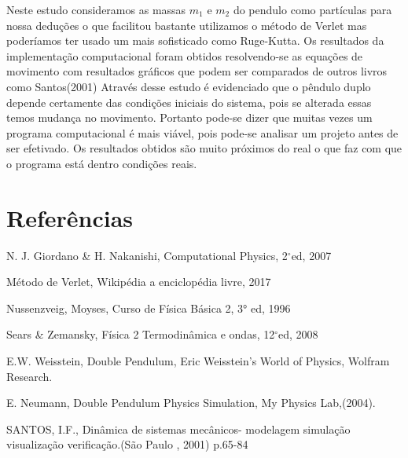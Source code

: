 \documentclass[a4paper]{article} %
\begin{document}
Neste estudo consideramos as massas $m_1$ e $m_2$ do pendulo como part\'{i}culas para nossa deduções o que facilitou bastante utilizamos o m\'{e}todo de Verlet mas poderíamos ter usado um mais sofisticado como Ruge-Kutta. Os resultados da implementação computacional foram obtidos resolvendo-se as equações de movimento com resultados gr\'{a}ficos que podem ser comparados de outros livros como Santos(2001)
Através desse estudo é evidenciado que o pêndulo duplo depende certamente das condições iniciais do sistema, pois se alterada essas temos mudança no movimento.
Portanto pode-se dizer que muitas vezes um programa computacional é mais viável, pois pode-se analisar um projeto antes de ser efetivado. Os resultados obtidos são muito próximos do real o que faz com que o programa está dentro condições reais.

\section*{Refer\^{e}ncias}

\noindent 

\indent N. J. Giordano \& H. Nakanishi, Computational Physics, 2${}^\circ$ed, 2007

\indent M\'etodo de Verlet, Wikip\'edia a enciclop\'edia livre, 2017

\indent Nussenzveig, Moyses, Curso de Física Básica 2, 3° ed, 1996

\indent Sears \& Zemansky, F\'{i}sica 2 Termodin\^{a}mica e ondas, 12${}^\circ$ed, 2008

\indent E.W. Weisstein, Double Pendulum, Eric Weisstein’s World of Physics, Wolfram Research.
 
\indent E. Neumann, Double Pendulum Physics Simulation, My Physics Lab,(2004).
 
\indent SANTOS, I.F., Din\^{a}mica de sistemas mec\^{a}nicos- modelagem simula\c{c}\~{a}o visualização verifica\c{c}\~{a}o.(S\~{a}o Paulo , 2001) p.65-84
\end{document}
